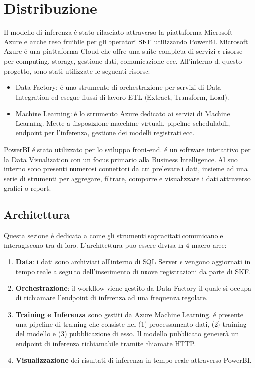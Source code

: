 \chapter{Distribuzione}
\label{chap:deploy}

Il modello di inferenza é stato rilasciato attraverso la piattaforma Microsoft Azure e anche reso fruibile per gli operatori SKF utilizzando PowerBI.
Microsoft Azure é una piattaforma Cloud che offre una suite completa di servizi e risorse per computing, storage, gestione dati, comunicazione ecc.
All'interno di questo progetto, sono stati utilizzate le seguenti risorse:
\begin{itemize}
	\item Data Factory: é uno strumento di orchestrazione per servizi di Data Integration ed esegue flussi di lavoro ETL (Extract, Transform, Load).
	\item Machine Learning: é lo strumento Azure dedicato ai servizi di Machine Learning. Mette a disposizione macchine virtuali, pipeline schedulabili, endpoint per l'inferenza, gestione dei modelli registrati ecc.
\end{itemize}

PowerBI é stato utilizzato per lo sviluppo front-end. é un software interattivo per la Data Visualization con un focus primario alla Business Intelligence. Al suo interno sono presenti numerosi connettori da cui prelevare i dati, insieme ad una serie di strumenti per aggregare, filtrare, comporre e visualizzare i dati attraverso grafici o report.

\section{Architettura}
Questa sezione é dedicata a come gli strumenti sopracitati comunicano e interagiscono tra di loro. L'architettura puo essere divisa in 4 macro aree:
\begin{enumerate}
	\item \textbf{Data}: i dati sono archiviati all'interno di SQL Server e vengono aggiornati in tempo reale a seguito dell'inserimento di nuove registrazioni da parte di SKF.
	\item \textbf{Orchestrazione}: il workflow viene gestito da Data Factory il quale si occupa di richiamare l'endpoint di inferenza ad una frequenza regolare.
	\item \textbf{Training e Inferenza} sono gestiti da Azure Machine Learning. é presente una pipeline di training che consiste nel (1) processamento dati, (2) training del modello e (3) pubblicazione di esso. Il modello pubblicato genererà un endpoint di inferenza richiamabile tramite chiamate HTTP. 
	\item \textbf{Visualizzazione} dei risultati di inferenza in tempo reale attraverso PowerBI.
\end{enumerate}

